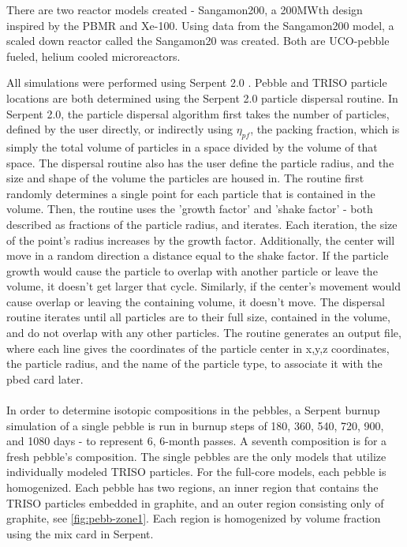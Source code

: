 There are two reactor models created - Sangamon200, a 200MWth design inspired by the PBMR and Xe-100.  Using data from the Sangamon200 model, a scaled down reactor called the Sangamon20 was created.  Both are UCO-pebble fueled, helium cooled microreactors.



All simulations were performed using Serpent 2.0 \cite{leppanenjaakko_serpent_2015}.  Pebble and TRISO particle locations are both determined using the Serpent 2.0 particle dispersal routine.  In Serpent 2.0, the particle dispersal algorithm first takes the number of particles, defined by the user directly, or indirectly using $\eta_{pf}$, the packing fraction, which is simply the total volume of particles in a space divided by the volume of that space.  The dispersal routine also has the user define the particle radius, and the size and shape of the volume the particles are housed in.  The routine first randomly determines a single point for each particle that is contained in the volume.  Then, the routine uses the 'growth factor' and 'shake factor' - both described as fractions of the particle radius, and iterates.  Each iteration, the size of the point's radius increases by the growth factor.  Additionally, the center will move in a random direction a distance equal to the shake factor.  If the particle growth would cause the particle to overlap with another particle or leave the volume, it doesn't get larger that cycle.  Similarly, if the center's movement would cause overlap or leaving the containing volume, it doesn't move.  The dispersal routine iterates until all particles are to their full size, contained in the volume, and do not overlap with any other particles.  The routine generates an output file, where each line gives the coordinates of the particle center in x,y,z coordinates, the particle radius, and the name of the particle type, to associate it with the pbed card later.
\\ \\

In order to determine isotopic compositions in the pebbles, a Serpent burnup simulation of a single pebble is run in burnup steps of 180, 360, 540, 720, 900, and 1080 days - to represent 6, 6-month passes.  A seventh composition is for a fresh pebble's composition.  The single pebbles are the only models that utilize individually modeled TRISO particles.  For the full-core models, each pebble is  homogenized.  Each pebble has two regions, an inner region that contains the TRISO particles embedded in graphite, and an outer region consisting only of graphite, see \ref{fig:pebb-zone1}.  Each region is homogenized by volume fraction using the mix card in Serpent.

